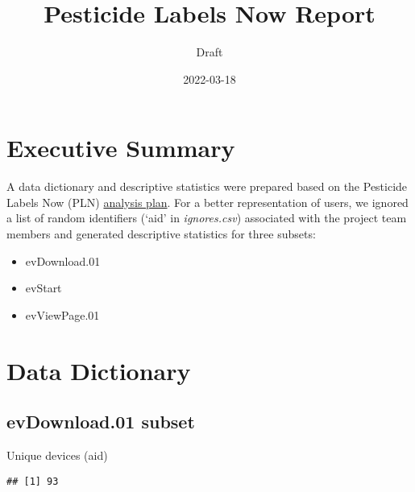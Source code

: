 \documentclass[
]{article}
\title{Pesticide Labels Now Report}
\subtitle{Draft}
\author{}
\date{\vspace{-2.5em}2022-03-18}
\newenvironment{Shaded}{\begin{snugshade}}{\end{snugshade}}
\newcommand{\AttributeTok}[1]{\textcolor[rgb]{0.77,0.63,0.00}{#1}}
\newcommand{\FloatTok}[1]{\textcolor[rgb]{0.00,0.00,0.81}{#1}}
\newcommand{\FunctionTok}[1]{\textcolor[rgb]{0.00,0.00,0.00}{#1}}
\newcommand{\NormalTok}[1]{#1}
\newcommand{\SpecialCharTok}[1]{\textcolor[rgb]{0.00,0.00,0.00}{#1}}
\newcommand{\StringTok}[1]{\textcolor[rgb]{0.31,0.60,0.02}{#1}}
\providecommand{\tightlist}{%
  \setlength{\itemsep}{0pt}\setlength{\parskip}{0pt}}
\begin{document}
\maketitle

{
\setcounter{tocdepth}{4}
\tableofcontents
}
\hypertarget{executive-summary}{%
\section{Executive Summary}\label{executive-summary}}

A data dictionary and descriptive statistics were prepared based on the
Pesticide Labels Now (PLN)
\href{https://docs.google.com/document/d/1mUHPYdpWljCWroODGenUjYlyae2ZWwqN4MScBLXlr2U/edit}{analysis
plan}. For a better representation of users, we ignored a list of random
identifiers (`aid' in \emph{ignores.csv}) associated with the project
team members and generated descriptive statistics for three subsets:

\begin{itemize}
\tightlist
\item
  evDownload.01
\item
  evStart
\item
  evViewPage.01
\end{itemize}

\hypertarget{data-dictionary}{%
\section{Data Dictionary}\label{data-dictionary}}

\hypertarget{evdownload.01-subset}{%
\subsection{evDownload.01 subset}\label{evdownload.01-subset}}

Unique devices (aid)

\begin{Shaded}
\end{Shaded}

\begin{verbatim}
## [1] 93
\end{verbatim}
\end{document}

